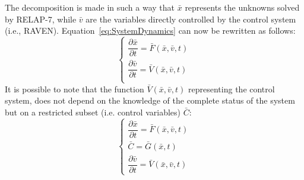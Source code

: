 \documentclass{anstrans}
\begin{document}
The decomposition is made in such a way that $\bar{x}$ represents the unknowns solved by RELAP-7, while $\bar{v}$ are the variables directly controlled by the control system (i.e., RAVEN). Equation~\ref{eq:SystemDynamics} can now be rewritten as follows:
\begin{equation}
\begin{cases}
\dfrac{\partial \bar{x}}{\partial t} = \bar{F}(\bar{x},\bar{v},t) \\
\dfrac{\partial \bar{v}}{\partial t} = \bar{V}(\bar{x},\bar{v},t) \\
\end{cases}
\label{eq:generalSystemEquation}
\end{equation}
It is possible to note that the function $\bar{V}(\bar{x},\bar{v},t)$ representing the control system, does not depend on the knowledge of the complete status of the system but on a restricted subset (i.e. control variables) $\bar{C}$:
\begin{equation}
\begin{cases}
\dfrac{\partial \bar{x}}{\partial t} = \bar{F}(\bar{x},\bar{v},t) \\
\bar{C} = \bar{G}(\bar{x},t) \\
\dfrac{\partial \bar{v}}{\partial t} = \bar{V}(\bar{x},\bar{v},t)
\end{cases}
\label{eq:generalSystemEquationwithControl}
\end{equation}
\end{document}
